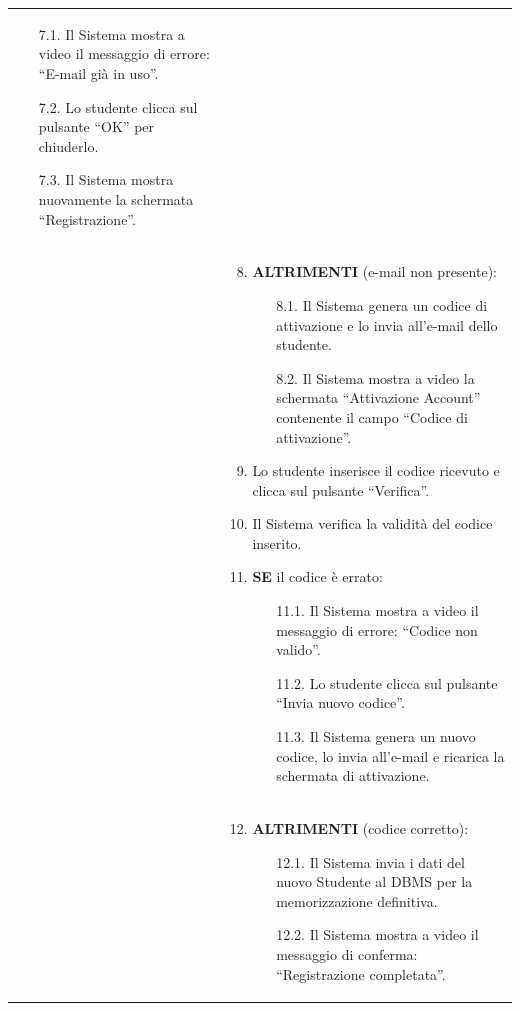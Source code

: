 \documentclass[12pt,a4paper]{article}
\begin{document}
\begin{longtable}{|
>{\columncolor{unipablue}\color{white}\bfseries\raggedright\arraybackslash}p{3.4cm}|
>{\raggedright\arraybackslash}p{11.1cm}|}
\begin{enumerate}
    \begin{itemize}
        \item[7.1.] Il Sistema mostra a video il messaggio di errore: ``E-mail già in uso''.
        \item[7.2.] Lo studente clicca sul pulsante ``OK'' per chiuderlo.
        \item[7.3.] Il Sistema mostra nuovamente la schermata ``Registrazione''.
    \end{itemize}
\end{enumerate} \\
&
\begin{enumerate}
    \setcounter{enumi}{7}
    \item \textbf{ALTRIMENTI} (e-mail non presente):
    \begin{itemize}
        \item[8.1.] Il Sistema genera un codice di attivazione e lo invia all'e-mail dello studente.
        \item[8.2.] Il Sistema mostra a video la schermata ``Attivazione Account'' contenente il campo ``Codice di attivazione''.
    \end{itemize}
    \item Lo studente inserisce il codice ricevuto e clicca sul pulsante ``Verifica''.
    \item Il Sistema verifica la validità del codice inserito.
    \item \textbf{SE} il codice è errato:
    \begin{itemize}
        \item[11.1.] Il Sistema mostra a video il messaggio di errore: ``Codice non valido''.
        \item[11.2.] Lo studente clicca sul pulsante ``Invia nuovo codice''.
        \item[11.3.] Il Sistema genera un nuovo codice, lo invia all'e-mail e ricarica la schermata di attivazione.
    \end{itemize}
\end{enumerate} \\
&
\begin{enumerate}
    \setcounter{enumi}{11}
    \item \textbf{ALTRIMENTI} (codice corretto):
    \begin{itemize}
        \item[12.1.] Il Sistema invia i dati del nuovo Studente al DBMS per la memorizzazione definitiva.
        \item[12.2.] Il Sistema mostra a video il messaggio di conferma: ``Registrazione completata''.

\end{itemize}
\end{enumerate}
\end{longtable}
\end{document}
